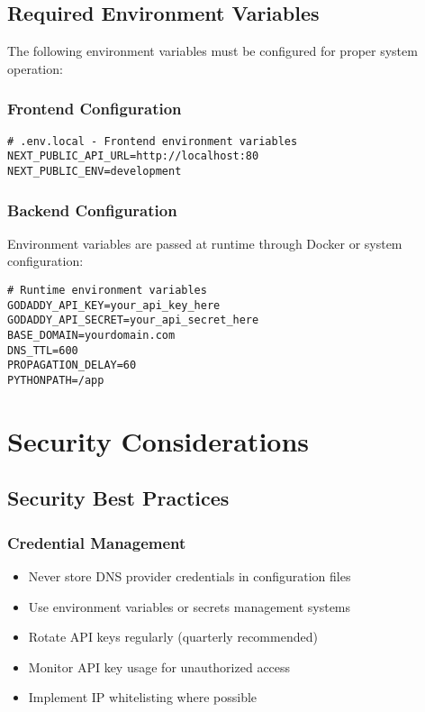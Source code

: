 \subsection{Required Environment Variables}

The following environment variables must be configured for proper system operation:

\subsubsection{Frontend Configuration}

\begin{verbatim}
# .env.local - Frontend environment variables
NEXT_PUBLIC_API_URL=http://localhost:80
NEXT_PUBLIC_ENV=development
\end{verbatim}

\subsubsection{Backend Configuration}

Environment variables are passed at runtime through Docker or system configuration:

\begin{verbatim}
# Runtime environment variables
GODADDY_API_KEY=your_api_key_here
GODADDY_API_SECRET=your_api_secret_here
BASE_DOMAIN=yourdomain.com
DNS_TTL=600
PROPAGATION_DELAY=60
PYTHONPATH=/app
\end{verbatim}

\section{Security Considerations}

\subsection{Security Best Practices}

\subsubsection{Credential Management}

\begin{itemize}
    \item Never store DNS provider credentials in configuration files
    \item Use environment variables or secrets management systems
    \item Rotate API keys regularly (quarterly recommended)
    \item Monitor API key usage for unauthorized access
    \item Implement IP whitelisting where possible
\end{itemize}

